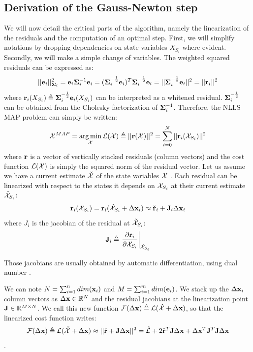 \subsection{Derivation of the Gauss-Newton step}
We will now detail the critical parts of the algorithm, namely the linearization of the residuals and the computation of an optimal step.
First, we will simplify notations by dropping dependencies on state variables $X_{S_i}$ where evident. 
Secondly, we will make a simple change of variables. The weighted squared residuals can be expressed as:
%
\begin{equation}
    ||{\bf e}_i||^2_{{\bm \Sigma}_i} = {\bf e}_i {\bm \Sigma}_i^{-1} {\bf e}_i 
    = ({\bm \Sigma}_i^{-\frac{1}{2}}{\bf e}_i)^T{\bm \Sigma}_i^{-\frac{1}{2}}{\bf e}_i
    = ||{\bm \Sigma}_i^{-\frac{1}{2}}{\bf e}_i||^2 = ||{\bf r}_i||^2
\end{equation}
%
where ${\bf r}_i(X_{S_i}) \triangleq {\bm \Sigma}_i^{-\frac{1}{2}}{\bf e}_i(X_{S_i})$ can be interpreted as a whitened residual. ${\bm \Sigma}_i^{-\frac{1}{2}}$ can be obtained
from the Cholesky factorization of ${\bm \Sigma}_i^{-1}$. Therefore, the NLLS MAP problem can simply be written:
%
\begin{equation}
    \mathcal{X}^{MAP} = \operatorname*{arg\,min}_{\mathcal{X}} \mathcal{L}(\mathcal{X}) \triangleq||{\bf r}(\mathcal{X})||^2 = \sum_{i=0}^N ||{\bf r}_i({\mathcal{X}_{S_i}})||^2 
\end{equation}
%
where ${\bf r}$ is a vector of vertically stacked residuals (column vectors) and the cost function $\mathcal{L}(\mathcal{X})$ is simply the squared norm 
of the residual vector. Let us assume we have a current estimate $\check{\mathcal{X}}$ of the state variables $\mathcal{X}$ .
Each residual can be linearized with respect to the states it depends on $\mathcal{X}_{S_i}$ at their current estimate $\check{\mathcal{X}}_{S_i}$:
%
\begin{equation}
    {\bf r}_i(\mathcal{X}_{S_i}) = {\bf r}_i(\check{\mathcal{X}}_{S_i} + \Delta {\bf x}_i) \approx \check{{\bf r}}_i + {\bf J}_i \Delta {\bf x}_i
\end{equation}
%
where $J_i$ is the jacobian of the residual at $\check{\mathcal{X}}_{S_i}$: 
%
\begin{equation}
    {\bf J}_i \triangleq \left.\frac{\partial {\bf r}_i}{\partial \mathcal{X}_{S_i}}\right|_{\check{\mathcal{X}}_{S_i}}
    \label{eq:res_jacobian}
\end{equation}

Those jacobians are usually obtained by automatic differentiation, \eg using dual number \cite{ceres-solver}. 

We can note $N = \sum_{i=1}^{n}dim({\bf x}_i)$ and $M = \sum_{i=1}^{m}dim({\bf e}_i)$.
We stack up the $\Delta {\bf x}_i$ column vectors as $\Delta {\bf x} \in \mathbb{R}^N$ and the residual jacobians at the linearization point 
${\bf J} \in \mathbb{R}^{M \times N}$. We call this new function $\mathcal{F}(\Delta {\bf x}) \triangleq \mathcal{L}(\check{\mathcal{X}} + \Delta {\bf x})$, so that the linearized cost function writes:  
%
\begin{equation}
    \mathcal{F}(\Delta {\bf x}) \triangleq \mathcal{L}(\check{\mathcal{X}} + \Delta {\bf x}) 
    \approx ||\check{{\bf r}} + {\bf J} \Delta {\bf x}||^2 
    = \check{\mathcal{L}} +  2\check{{\bf r}}^T {\bf J} \Delta {\bf x} + \Delta {\bf x}^T {\bf J}^T {\bf J} \Delta {\bf x}
\end{equation}.

